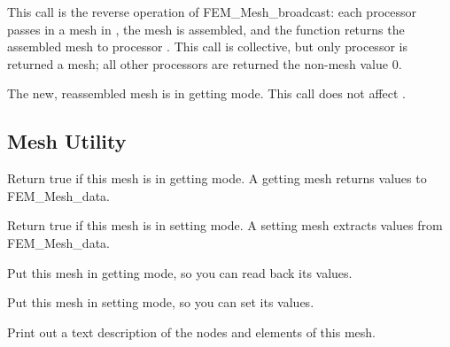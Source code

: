   

This call is the reverse operation of FEM\_Mesh\_broadcast:
each processor passes in a mesh in , the mesh is 
assembled, and the function returns the assembled mesh
to processor .  This call is collective, but 
only processor  is returned a mesh; all other
processors are returned the non-mesh value 0.

The new, reassembled mesh is in getting mode.
This call does not affect .


\subsection{Mesh Utility}


Return true if this mesh is in getting mode.
A getting mesh returns values to FEM\_Mesh\_data.


Return true if this mesh is in setting mode.
A setting mesh extracts values from FEM\_Mesh\_data.



Put this mesh in getting mode, so you can read back
its values.


Put this mesh in setting mode, so you can set its values.


Print out a text description of the nodes and elements 
of this mesh.


